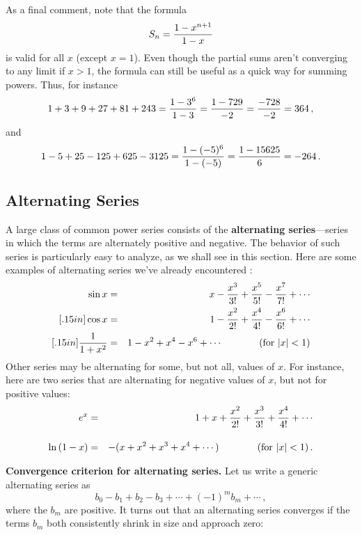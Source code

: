 {{{{\begin{center}
{{   \vspace{4pt}}
}
\end{center}

As a final comment, note that the formula
\[
S_n=  {1 - x^{n+1} \over 1-x}
\]
is valid for all $x$ (except $x=1$).  Even though the partial sums aren't converging to any limit if $x>1$, the formula can still be useful as a quick way for summing powers.  Thus, for instance
\[
1+3+9+27+81+243={1-3^6 \over 1-3}={1-729 \over -2}={-728 \over -2}=364 \, ,
\]
and
\[
1-5+25-125+625-3125={1-(-5)^6 \over 1-(-5)}={1-15625 \over 6}=-264 \, .
\]


\subsection{Alternating Series}

A large class of common 
power series consists of the {\bf alternating series}---series in which the terms are alternately positive and negative.  The behavior of such series is particularly easy to analyze, as we shall see in this section. Here are some examples of alternating series we've already encountered :
        \begin{eqnarray*}
        \sin{x} &=& x - {x^3 \over 3!} + {x^5 \over 5!} 
                - {x^7 \over 7!} + \cdots \\ [.15in]
        \cos{x} &=& 1 - {x^2 \over 2!} + {x^4 \over 4!} 
                - {x^6 \over 6!} + \cdots \\ [.15in]
        {\displaystyle {1 \over 1+x^2}}&=&{\displaystyle 1-x^2+x^4-x^6+\cdots } \mbox{\hspace{.5in} (for $|x|<1$)}
        \end{eqnarray*}
Other series may be alternating for some, but not all, values of $x$. For instance, here are two series that are alternating for negative values of $x$, but not for positive values:
\begin{eqnarray*}
        e^x&=&{\displaystyle 1+x+{x^2 \over 2!}+{x^3 \over 3!}+{x^4 \over 4!}+\cdots} \\[.15in]
                \ln{(1-x)} &=& -(x+x^2+x^3+x^4 +   \cdots )\mbox{\hspace{.5in} (for $|x|<1$)} \, .
\end{eqnarray*} 

\medskip



{\bf Convergence criterion for alternating series.}  Let us write a generic alternating series as
\[
b_0-b_1 + b_2 - b_3 + \cdots + (-1)^mb_m + \cdots \, ,
\]
where the $b_m$ are positive. It turns out that an alternating series converges if the terms $b_m$ both consistently shrink in size and approach zero:

}}}}
